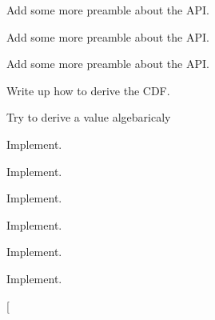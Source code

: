 
\begin{DoxyRefList}
\item[\label{todo__todo000021}%
\hypertarget{todo__todo000021}{}%
Group \hyperlink{group__api}{api} ]Add some more preamble about the A\-P\-I.



Add some more preamble about the A\-P\-I.



Add some more preamble about the A\-P\-I.


\item[\label{todo__todo000001}%
\hypertarget{todo__todo000001}{}%
Global \hyperlink{_cube_8h_aa32dd25cda8601c7f6af2dbd096dc58c}{Cube\-Distance\-C\-D\-F} (double a, double $\ast$b)]Write up how to derive the C\-D\-F.  
\item[\label{todo__todo000002}%
\hypertarget{todo__todo000002}{}%
Global \hyperlink{_cube_8h_ac37d5ff3c99d8637fc414212ac041f18}{Cube\-Distance\-Var} (double $\ast$parameters)]Try to derive a value algebaricaly  
\item[\label{todo__todo000003}%
\hypertarget{todo__todo000003}{}%
Global \hyperlink{_cylinder_8h_a60d5666a2268964e3fff230e057e828a}{Cylinder\-Distance\-C\-D\-F} (double t, double $\ast$parameters)]Implement.  
\item[\label{todo__todo000004}%
\hypertarget{todo__todo000004}{}%
Global \hyperlink{_cylinder_8h_adf8f548d76cfc904e4a540e77c706f09}{Cylinder\-Distance\-Mean} (double $\ast$parameters)]Implement.  
\item[\label{todo__todo000005}%
\hypertarget{todo__todo000005}{}%
Global \hyperlink{_cylinder_8h_ab020730a65188640c7ead4a6bae27b14}{Cylinder\-Distance\-Var} (double $\ast$parameters)]Implement.  
\item[\label{todo__todo000006}%
\hypertarget{todo__todo000006}{}%
Global \hyperlink{_cylindrical_surface_8h_a87cb99abacc93b315975d6e483623057}{Cylindrical\-Surface\-Distance\-C\-D\-F} (double t, double $\ast$parameters)]Implement.  
\item[\label{todo__todo000007}%
\hypertarget{todo__todo000007}{}%
Global \hyperlink{_cylindrical_surface_8h_a545382429eb1caef4ad1b94ea081c5ff}{Cylindrical\-Surface\-Distance\-Mean} (double $\ast$parameters)]Implement.  
\item[\label{todo__todo000008}%
\hypertarget{todo__todo000008}{}%
Global \hyperlink{_cylindrical_surface_8h_a75ae68f76ede8f66bfae17c1de5b8e6e}{Cylindrical\-Surface\-Distance\-Var} (double $\ast$parameters)]Implement.  
\item[\label{todo__todo000009}%

\end{DoxyRefList}
